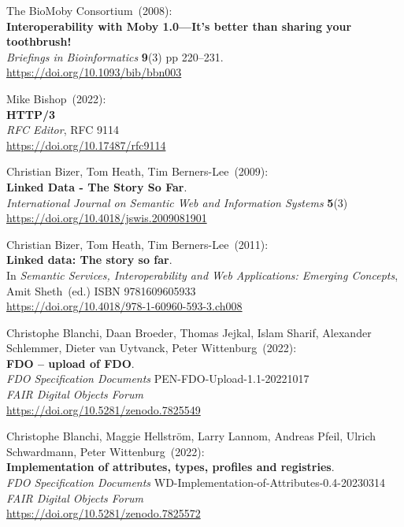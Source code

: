 \begin{thebibliography}{9}
The BioMoby Consortium~(2008): \\
\textbf{Interoperability with Moby 1.0---It's better than sharing your
toothbrush!}\\
\emph{Briefings in Bioinformatics} \textbf{9}(3) pp
220--231.\\
\url{https://doi.org/10.1093/bib/bbn003}

Mike Bishop~(2022): \\
\textbf{{HTTP}/3}\\
\emph{RFC Editor}, RFC 9114 \\  
\url{https://doi.org/10.17487/rfc9114}

Christian Bizer, Tom Heath, Tim Berners-Lee~(2009): \\
\textbf{Linked Data - The Story So Far}.\\
\emph{International Journal on Semantic Web and Information Systems}
\textbf{5}(3)\\
\url{https://doi.org/10.4018/jswis.2009081901}

Christian Bizer, Tom Heath, Tim Berners-Lee~(2011): \\
\textbf{Linked data: The story so far}.\\
In \emph{Semantic Services, Interoperability and Web Applications:
Emerging Concepts}, Amit Sheth~(ed.) ISBN 9781609605933\\
\url{https://doi.org/10.4018/978-1-60960-593-3.ch008}

Christophe Blanchi, Daan Broeder, Thomas Jejkal, Islam Sharif, Alexander
Schlemmer, Dieter van Uytvanck, Peter Wittenburg~(2022): \\
\textbf{FDO -- upload of FDO}.\\
\emph{FDO Specification Documents} PEN-FDO-Upload-1.1-20221017 \\
\emph{FAIR Digital Objects Forum}\\ 
\url{https://doi.org/10.5281/zenodo.7825549}

Christophe Blanchi, Maggie Hellström, Larry Lannom, Andreas Pfeil, Ulrich Schwardmann, Peter Wittenburg~(2022): \\
\textbf{Implementation of
attributes, types, profiles and registries}. \\
\emph{FDO Specification Documents} WD-Implementation-of-Attributes-0.4-20230314 \\
\emph{FAIR Digital Objects Forum}\\ 
\url{https://doi.org/10.5281/zenodo.7825572}


\end{thebibliography}
